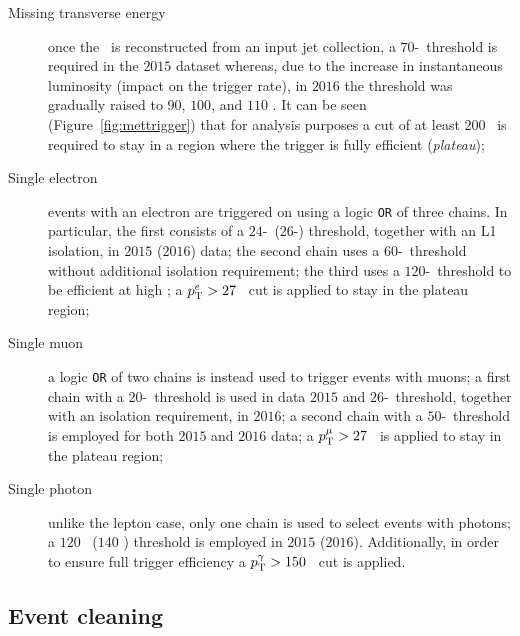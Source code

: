 			\begin{description}
				\item [Missing transverse energy] once the \met\ is reconstructed from an input jet collection, a $70$-\GeV\ threshold is required in the $2015$ dataset whereas, due to the increase in instantaneous luminosity (impact on the trigger rate), in $2016$ the threshold was gradually raised to $90$, $100$, and $110$ \GeV. It can be seen (Figure~\ref{fig:mettrigger}) that for analysis purposes a cut of at least $200$ \GeV\ is required to stay in a region where the trigger is fully efficient (\emph{plateau}); 

				\item [Single electron] events with an electron are triggered on using a logic \texttt{OR} of three chains. In particular, the first consists of a $24$-\GeV\ ($26$-\GeV) threshold, together with an \ac{L1} isolation, in $2015$ ($2016$) data; the second chain uses a $60$-\GeV\ threshold without additional isolation requirement; the third uses a $120$-\GeV\ threshold to be efficient at high \et; a $p_{\mathrm{T}}^e > 27$ \GeV\ cut is applied to stay in the plateau region;

				\item [Single muon] a logic \texttt{OR} of two chains is instead used to trigger events with muons; a first chain with a $20$-\GeV\ threshold is used in data $2015$ and $26$-\GeV\ threshold, together with an isolation requirement, in $2016$; a second chain with a $50$-\GeV\ threshold is employed for both $2015$ and $2016$ data; a $p_{\mathrm{T}}^\mu > 27$ \GeV\ is applied to stay in the plateau region;

				\item [Single photon] unlike the lepton case, only one chain is used to select events with photons; a $120$ \GeV\ ($140$ \GeV) threshold is employed in $2015$ ($2016$). Additionally, in order to ensure full trigger efficiency a $p_{\mathrm{T}}^\gamma > 150$ \GeV\ cut is applied.
			\end{description}


		\subsection{Event cleaning}

